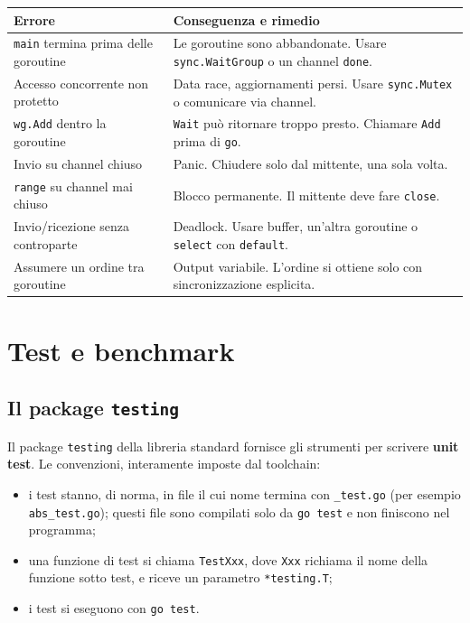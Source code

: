 \documentclass[11pt,a4paper]{report}
\newcommand{\cod}[1]{\texttt{#1}}
\begin{document}
\begin{center}
\small
\begin{tabular}{@{}p{}p{}@{}}
\toprule
\textbf{Errore} & \textbf{Conseguenza e rimedio}\\
\midrule
\cod{main} termina prima delle goroutine & Le goroutine sono abbandonate.
Usare \cod{sync.WaitGroup} o un channel \cod{done}.\\[0.4em]
Accesso concorrente non protetto & Data race, aggiornamenti persi. Usare
\cod{sync.Mutex} o comunicare via channel.\\[0.4em]
\cod{wg.Add} dentro la goroutine & \cod{Wait} può ritornare troppo presto.
Chiamare \cod{Add} prima di \cod{go}.\\[0.4em]
Invio su channel chiuso & Panic. Chiudere solo dal mittente, una sola volta.\\[0.4em]
\cod{range} su channel mai chiuso & Blocco permanente. Il mittente deve fare
\cod{close}.\\[0.4em]
Invio/ricezione senza controparte & Deadlock. Usare buffer, un'altra
goroutine o \cod{select} con \cod{default}.\\[0.4em]
Assumere un ordine tra goroutine & Output variabile. L'ordine si ottiene
solo con sincronizzazione esplicita.\\
\bottomrule
\end{tabular}
\end{center}

\chapter{Test e benchmark}\label{ch:test}

\section{Il package \texttt{testing}}

Il package \cod{testing} della libreria standard fornisce gli strumenti per
scrivere \textbf{unit test}. Le convenzioni, interamente imposte dal toolchain:

\begin{itemize}
  \item i test stanno, di norma, in file il cui nome termina con
        \texttt{\_test.go} (per esempio \texttt{abs\_test.go}); questi file
        sono compilati solo da \cod{go test} e non finiscono nel programma;
  \item una funzione di test si chiama \cod{TestXxx}, dove \cod{Xxx} richiama il
        nome della funzione sotto test, e riceve un parametro
        \cod{*testing.T};
  \item i test si eseguono con \cod{go test}.
\end{itemize}
\end{document}
